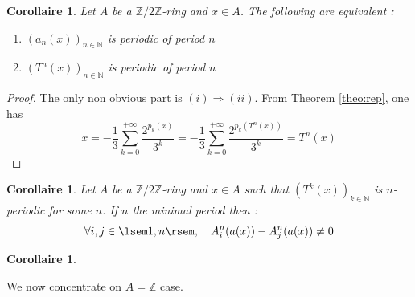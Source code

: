 \documentclass[12pt,a4paper]{article}
\newtheorem{cor}[lem]{Corollaire}
\def\NN{\mathbb{N}}
\def\ZZ{\mathbb{Z}}
\begin{document}
\begin{cor}Let $A$ be a $\ZZ/2\ZZ$-ring and  $x\in A$. The following are equivalent : 
\begin{enumerate}
\item  $\left(a_n(x)\right)_{n\in \NN}$ is periodic of period $n$
\item  $\left(T^n(x)\right)_{n\in \NN}$ is periodic of period $n$
\end{enumerate}
\end{cor}
\begin{proof}
 The only non obvious part is $(i)\Rightarrow (ii)$.  
 From Theorem \ref{theo:rep}, one has 
 $$ x= -\frac{1}{3}\sum_{k=0}^{+\infty} \frac{2^{p_k(x)}}{3^k} = -\frac{1}{3}\sum_{k=0}^{+\infty} \frac{2^{p_k(T^n(x))}}{3^k} = T^n(x)  $$
\end{proof}
\begin{cor}  Let $A$ be a $\ZZ/2\ZZ$-ring and  $x\in A$ such that $\left(T^k(x)\right)_{k\in\NN}$ is $n$-periodic for some $n$.  If $n$ the minimal period then :
$$\forall i,j\in \lsem 1,n\rsem,\quad A_i^n(a(x))-A_j^n(a(x)) \neq 0$$
\end{cor}
\begin{cor}  
\end{cor}
We now concentrate on  $A=\ZZ$ case. 
\end{document}
